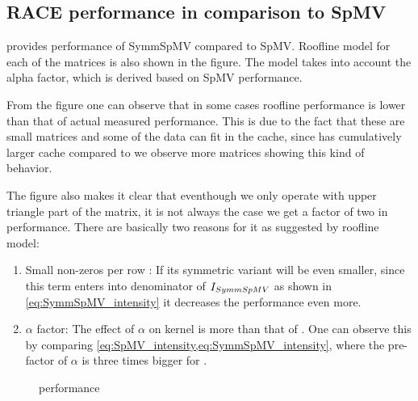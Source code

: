 \subsection{RACE performance in comparison to SpMV}
 provides performance of SymmSpMV compared to SpMV. Roofline \cite{Williams_roofline} model for each of the matrices is also shown in the figure. The model takes into account the alpha factor, which is derived based on SpMV performance.

 From the figure one can observe that in some cases roofline performance is lower than that of actual measured performance. This is due to the fact that these are small matrices and some of the data can fit in the cache, since \SKX has cumulatively larger cache compared to \IVB we observe more matrices showing this kind of behavior.
 
 The figure also makes it clear that eventhough we only operate with upper triangle part of the matrix, it is not always the case we get a factor of two in performance. There are basically two reasons for it as suggested by roofline model:
 \begin{enumerate}
 	\item Small non-zeros per row \NNZR: If \NNZR its symmetric variant \NNZRSYMM will be even smaller, since this term enters into denominator of $I_{SymmSpMV}$ as shown in \cref{eq:SymmSpMV_intensity} it decreases the performance even more.
 	\item $\alpha$ factor: The effect of $\alpha$ on \SymmSpmv kernel is more than that of \SpMV. One can observe this by comparing \cref{eq:SpMV_intensity,eq:SymmSpMV_intensity}, where the  pre-factor of $\alpha$ is three times bigger for \SymmSpmv.
 \end{enumerate}

\begin{figure}[thbp]
	\centering
	\hspace{1em}
	\caption{\SymmSpmv performance}
	\label{fig:symm_spmv}
\end{figure}



